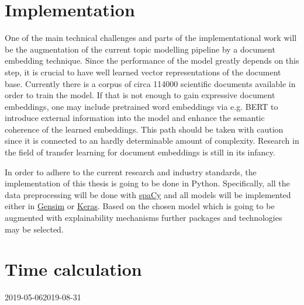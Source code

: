 \documentclass[pdftex,a4paper,12pt]{scrartcl}
\begin{document}
\section{Implementation}

One of the main technical challenges and parts of the implementational work will be the augmentation of the current topic modelling pipeline by a document embedding technique. Since the performance of the model greatly depends on this step, it is crucial to have well learned vector representations of the document base. Currently there is a corpus of circa 114000 scientific documents available in order to train the model. If that is not enough to gain expressive document embeddings, one may include pretrained word embeddings via e.g. BERT \cite{devlinBERTPretrainingDeep2018} to introduce external information into the model and enhance the semantic coherence of the learned embeddings. This path should be taken with caution since it is connected to an hardly determinable amount of complexity. Research in the field of transfer learning for document embeddings is still in its infancy.

In order to adhere to the current research and industry standards, the implementation of this thesis is going to be done in Python. Specifically, all the data preprocessing will be done with \href{https://spacy.io/}{spaCy} and all models will be  implemented either in \href{https://radimrehurek.com/gensim/}{Gensim} or \href{https://keras.io/}{Keras}. Based on the chosen model which is going to be augmented with explainability mechanisms further packages and technologies may be selected.

\section{Time calculation}

\begin{ganttchart}[
	hgrid,
	vgrid={*{6}{draw=none}, dotted},
	x unit=0.115cm,
	expand chart=\textwidth,
	time slot format=isodate,
	calendar week text = {\currentweek{}},
	milestone left shift =-1,
	milestone right shift =2,
	chart element start border=right,
	link bulge = 1.3,
	link/.style={-to, rounded corners = 3pt}
	]{2019-05-06}{2019-08-31}
	 \\
	 \\
	 \\
	 \\
	 \\
	  \\
	 \\
\end{ganttchart}


\newpage
{}
{}   %
\end{document}
